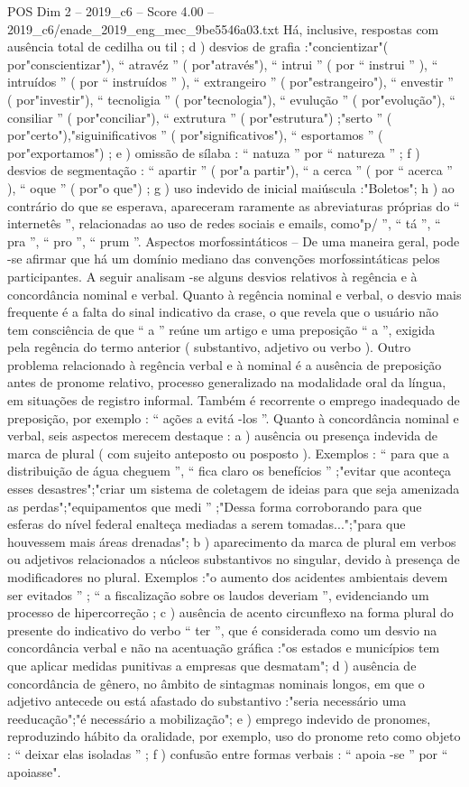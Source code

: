 \begin{textsample}{POS Dim 2 – 2019\_c6 – Score 4.00 – 2019\_c6/enade\_2019\_eng\_mec\_9be5546a03.txt}
Há, inclusive, respostas com ausência total de cedilha ou til ; d ) desvios de grafia :"concientizar"( por"conscientizar"), “ atravéz ” ( por"através"), “ intrui ” ( por “ instrui ” ), “ intruídos ” ( por “ instruídos ” ), “ extrangeiro ” ( por"estrangeiro"), “ envestir ” ( por"investir"), “ tecnoligia ” ( por"tecnologia"), “ evulução ” ( por"evolução"), “ consiliar ” ( por"conciliar"), “ extrutura ” ( por"estrutura") ;"serto ” ( por"certo"),"siguinificativos ” ( por"significativos"), “ esportamos ” ( por"exportamos") ; e ) omissão de sílaba : “ natuza ” por “ natureza ” ; f ) desvios de segmentação : “ apartir ” ( por"a partir"), “ a cerca ” ( por “ acerca ” ), “ oque ” ( por"o que") ; g ) uso indevido de inicial maiúscula :"Boletos"; h ) ao contrário do que se esperava, apareceram raramente as abreviaturas próprias do “ internetês ”, relacionadas ao uso de redes sociais e emails, como"p/ ”, “ tá ”, “ pra ”, “ pro ”, “ prum ”.
Aspectos morfossintáticos – De uma maneira geral, pode -se afirmar que há um domínio mediano das convenções morfossintáticas pelos participantes.
A seguir analisam -se alguns desvios relativos à regência e à concordância nominal e verbal.
Quanto à regência nominal e verbal, o desvio mais frequente é a falta do sinal indicativo da crase, o que revela que o usuário não tem consciência de que “ a ” reúne um artigo e uma preposição “ a ”, exigida pela regência do termo anterior ( substantivo, adjetivo ou verbo ).
Outro problema relacionado à regência verbal e à nominal é a ausência de preposição antes de pronome relativo, processo generalizado na modalidade oral da língua, em situações de registro informal.
Também é recorrente o emprego inadequado de preposição, por exemplo : “ ações a evitá -los ”.
Quanto à concordância nominal e verbal, seis aspectos merecem destaque : a ) ausência ou presença indevida de marca de plural ( com sujeito anteposto ou posposto ).
Exemplos : “ para que a distribuição de água cheguem ”, “ fica claro os benefícios ” ;"evitar que aconteça esses desastres";"criar um sistema de coletagem de ideias para que seja amenizada as perdas";"equipamentos que medi ” ;"Dessa forma corroborando para que esferas do nível federal enalteça mediadas a serem tomadas...";"para que houvessem mais áreas drenadas"; b ) aparecimento da marca de plural em verbos ou adjetivos relacionados a núcleos substantivos no singular, devido à presença de modificadores no plural.
Exemplos :"o aumento dos acidentes ambientais devem ser evitados ” ; “ a fiscalização sobre os laudos deveriam ”, evidenciando um processo de hipercorreção ; c ) ausência de acento circunflexo na forma plural do presente do indicativo do verbo “ ter ”, que é considerada como um desvio na concordância verbal e não na acentuação gráfica :"os estados e municípios tem que aplicar medidas punitivas a empresas que desmatam"; d ) ausência de concordância de gênero, no âmbito de sintagmas nominais longos, em que o adjetivo antecede ou está afastado do substantivo :"seria necessário uma reeducação";"é necessário a mobilização"; e ) emprego indevido de pronomes, reproduzindo hábito da oralidade, por exemplo, uso do pronome reto como objeto : “ deixar elas isoladas ” ; f ) confusão entre formas verbais : “ apoia -se ” por “ apoiasse".

\end{textsample}
